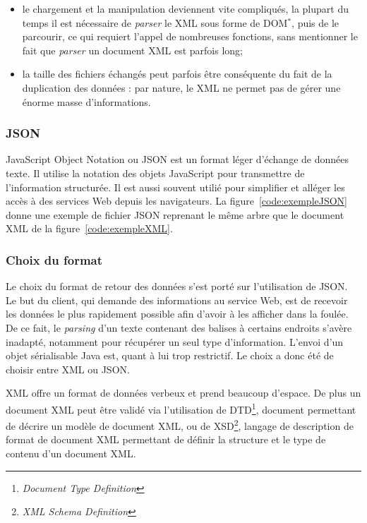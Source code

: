 \begin{itemize}
	\item le chargement et la manipulation deviennent vite compliqu\'es, la plupart du temps il est n\'ecessaire de \textit{parser} le XML sous forme de DOM$^*$, puis de le parcourir, ce qui requiert l'appel de nombreuses fonctions, sans mentionner le fait que \textit{parser} un document XML est parfois long;
	\item la taille des fichiers \'echang\'es peut parfois \^etre cons\'equente du fait de la duplication des donn\'ees : par nature, le XML ne permet pas de g\'erer une \'enorme masse d'informations.

\end{itemize}

\subsubsection{JSON}

JavaScript Object Notation ou JSON est un format l\'eger d'\'echange de donn\'ees texte.
Il utilise la notation des objets JavaScript pour transmettre de l'information structur\'ee.
Il est aussi souvent utili\'e pour simplifier et all\'eger les acc\`es \`a des services Web depuis les navigateurs.
La figure~\ref{code:exempleJSON} donne une exemple de fichier JSON reprenant le m\^eme arbre que le document XML de la figure~\ref{code:exempleXML}.

\vspace{0.20cm}


\label{code:exempleJSON}

\subsubsection{Choix du format}

Le choix du format de retour des donn\'ees s'est port\'e sur l'utilisation de JSON.
Le but du client, qui demande des informations au service Web, est de recevoir les donn\'ees le plus rapidement possible afin d'avoir \`a les afficher dans la foul\'ee.
De ce fait, le \textit{parsing} d'un texte contenant des balises \`a certains endroits s'av\`ere inadapt\'e, notamment pour r\'ecup\'erer un seul type d'information.
L'envoi d'un objet s\'erialisable Java est, quant \`a lui trop restrictif. Le choix a donc \'et\'e de choisir entre XML ou JSON.

XML offre un format de donn\'ees verbeux et prend beaucoup d'espace. 
De plus un document XML peut \^etre valid\'e via l'utilisation de DTD\protect\footnote{\textit{Document Type Definition}}, document permettant de d\'ecrire un mod\`ele de document XML, ou de XSD\protect\footnote{\textit{XML Schema Definition}}, langage de description de format de document XML permettant de d\'efinir la structure et le type de contenu d'un document XML.

